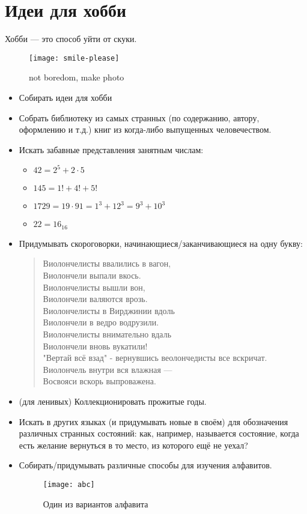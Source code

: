 \section{Идеи для хобби}
Хобби --- это способ уйти от скуки.
\begin{figure}[ht!]
    \centering
    \texttt{[image: smile-please]}
    \caption{not boredom, make photo}
\end{figure}
\begin{itemize}
\item Собирать идеи для хобби
\item Собрать библиотеку из самых странных (по содержанию, автору, оформлению и т.д.) книг из когда-либо выпущенных человечеством.
\item Искать забавные представления занятным числам:
  \begin{itemize}
    \item  $42 = 2^5 + 2 \cdot 5$
    \item  $145 = 1! + 4! + 5!$
    \item  $1729 = 19 \cdot 91 = 1^3 + 12^3 = 9^3 + 10^3$
    \item  $22 = 16_{16}$
  \end{itemize}
\item Придумывать скороговорки, начинающиеся/заканчивающиеся на одну букву:
\begin{flushleft}
\begin{verse}
Виолончелисты ввалились в вагон,\\
Виолончели выпали вкось.\\
Виолончелисты вышли вон,\\
Виолончели валяются врозь.\\

Виолончелисты в Вирджинии вдоль\\
Виолончели в ведро водрузили.\\
Виолончелисты внимательно вдаль\\
Виолончели вновь вукатили!\\

"Вертай всё взад" - вернувшись веолончедисты все вскричат.\\
Виолончель внутри вся влажная ---\\
Восвояси вскорь выпроважена.
\end{verse}
\end{flushleft}

\item (для ленивых) Коллекционировать прожитые годы.
\item Искать в других языках (и придумывать новые в своём) для обозначения различных странных состояний: как, например, называется состояние, когда есть желание вернуться в то место, из которого ещё не уехал?
\item Собирать/придумывать различные способы для изучения алфавитов.
\begin{figure}[ht!]
    \centering
    \texttt{[image: abc]}
    \caption{Один из вариантов алфавита}
\end{figure}
\end{itemize}
